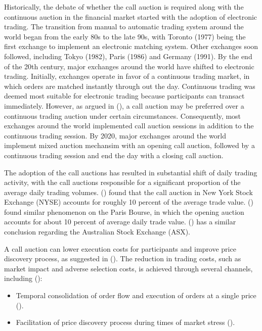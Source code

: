\documentclass{article}
\begin{document}
Historically, the debate of whether the call auction is required along with the continuous auction in the financial market started with the adoption of electronic trading. The transition from manual to automatic trading system around the world began from the early 80s to the late 90s, with Toronto (1977) being the first exchange to implement an electronic matching system. Other exchanges soon followed, including Tokyo (1982), Paris (1986) and Germany (1991). By the end of the 20th century, major exchanges around the world have shifted to electronic trading. Initially, exchanges operate in favor of a continuous trading market, in which orders are matched instantly through out the day. Continuous trading was deemed most suitable for electronic trading because participants can transact immediately. However, as argued in (\cite{Economides1995}), a call auction may be preferred over a continuous trading auction under certain circumstances. Consequently, most exchanges around the world implemented call auction sessions in addition to the continuous trading session. By 2020, major exchanges around the world implement mixed auction mechansim with an opening call auction, followed by a continuous trading session and end the day with a closing call auction.

The adoption of the call auctions has resulted in substantial shift of daily trading activity, with the call auctions responsible for a significant proportion of the average daily trading volumes. (\cite{Madhavan2015}) found that the call auction in New York Stock Exchange (NYSE) accounts for roughly 10 percent of the average trade value. (\cite{Bruno1999}) found similar phenomenon on the Paris Bourse, in which the opening auction accounts for about 10 percent of average daily trade value. (\cite{Carole2006}) has a similar conclusion regarding the Australian Stock Exchange (ASX).

A call auction can lower execution costs for participants and improve price discovery process, as suggested in (\cite{Pagano2003}). The reduction in trading costs, such as market impact and adverse selection costs, is achieved through several channels, including (\cite{Carole2006}):

\begin{itemize}
  \item Temporal consolidation of order flow and execution of orders at a single price (\cite{Economides1995}).
  \item Facilitation of price discovery process during times of market stress (\cite{Madhavan1992}).
\end{itemize}
\end{document}
